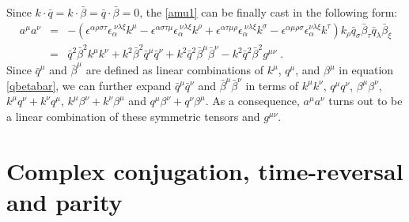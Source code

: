 \documentclass[prd,superscriptaddress,nofootinbib,notitlepage]{revtex4-1}
\begin{document}
%
Since $k\cdot\bar{q}=k\cdot\bar{\beta}=\bar{q}\cdot\bar{\beta}=0$, the \eqref{amu1} can be finally cast
in the following form:
%
\begin{eqnarray*}
a^{\mu}a^{\nu} & = & -\left(\epsilon^{\alpha\rho\sigma\tau}\epsilon_{\alpha}^{\ \nu\lambda\xi}k^{\mu}
-\epsilon^{\alpha\sigma\tau\mu}\epsilon_{\alpha}^{\ \nu\lambda\xi}k^{\rho}+\epsilon^{\alpha\tau\mu\rho}
\epsilon_{\alpha}^{\ \nu\lambda\xi}k^{\sigma}-\epsilon^{\alpha\mu\rho\sigma}
\epsilon_{\alpha}^{ \nu\lambda\xi}k^{\tau}\right)k_{\rho}\bar{q}_{\sigma}\bar{\beta}_{\tau}\bar{q}_{\lambda}
\bar{\beta}_{\xi}\nonumber \\
 & = & \bar{q}^{2}\bar{\beta}^{2}k^{\mu}k^{\nu}+k^{2}\bar{\beta}^{2}\bar{q}^{\mu}\bar{q}^{\nu}+
 k^{2}\bar{q}^{2}\bar{\beta}^{\mu}\bar{\beta}^{\nu}-k^{2}\bar{q}^{2}\bar{\beta}^{2}g^{\mu\nu}\;.
\end{eqnarray*}
%
Since $\bar{q}^{\mu}$ and $\bar{\beta}^{\mu}$ are defined as linear combinations of $k^{\mu}$, $q^{\mu}$, and $\beta^{\mu}$
in equation \eqref{qbetabar}, we can further expand $\bar{q}^{\mu}\bar{q}^{\nu}$ and $\bar{\beta}^{\mu}\bar{\beta}^{\nu}$
in terms of $k^{\mu}k^{\nu}$, $q^{\mu}q^{\nu}$, $\beta^{\mu}\beta^{\nu}$, $k^{\mu}q^{\nu}+k^{\nu}q^{\mu}$, 
$k^{\mu}\beta^{\nu}+k^{\nu}\beta^{\mu}$ and $q^{\mu}\beta^{\nu}+q^{\nu}\beta^{\mu}$. As a consequence, $a^{\mu}a^{\nu}$
turns out to be a linear combination of these symmetric tensors and $g^{\mu\nu}$. 

\section{Complex conjugation, time-reversal and parity}
\label{SECTION: symmetries}
\end{document}
